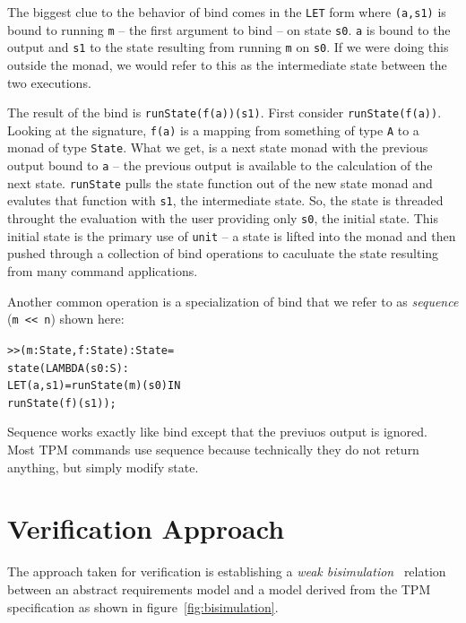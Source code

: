\documentclass[10pt]{article}
\begin{document}
The biggest clue to the behavior of bind comes in the \verb!LET! form
where \verb!(a,s1)! is bound to running \verb!m! -- the first argument
to bind -- on state \verb!s0!.  \verb!a! is bound to the output and
\verb!s1! to the state resulting from running \verb!m! on \verb!s0!.
If we were doing this outside the monad, we would refer to this as the
intermediate state between the two executions.

The result of the bind is \verb+runState(f(a))(s1)+.  First consider
\verb+runState(f(a))+.  Looking at the signature, \verb+f(a)+ is a
mapping from something of type \verb+A+ to a monad of type
\verb+State+.  What we get, is a next state monad with the previous
output bound to \verb+a+ -- the previous output is available to the
calculation of the next state.  \verb+runState+ pulls the state
function out of the new state monad and evalutes that function with
\verb+s1+, the intermediate state.  So, the state is threaded throught
the evaluation with the user providing only \verb+s0+, the initial
state.  This initial state is the primary use of \verb+unit+ -- a
state is lifted into the monad and then pushed through a collection of
bind operations to caculuate the state resulting from many command
applications.

Another common operation is a specialization of bind that we refer to
as \emph{sequence} (\verb+m << n+) shown here:

\begin{alltt}
 >> (m:State,f:State):State =
   state(LAMBDA(s0:S):
          LET (a,s1) = runState(m)(s0) IN
            runState(f)(s1));
\end{alltt}

Sequence works exactly like bind except that the previuos output is
ignored.  Most TPM commands use sequence because technically they do
not return anything, but simply modify state.

\section{Verification Approach}

The approach taken for verification is establishing a \emph{weak
  bisimulation}~\citep{Sangiorgi:12:Introduction-to} relation between
an abstract requirements model and a model derived from the TPM
specification as shown in figure~\ref{fig:bisimulation}.
\end{document}
